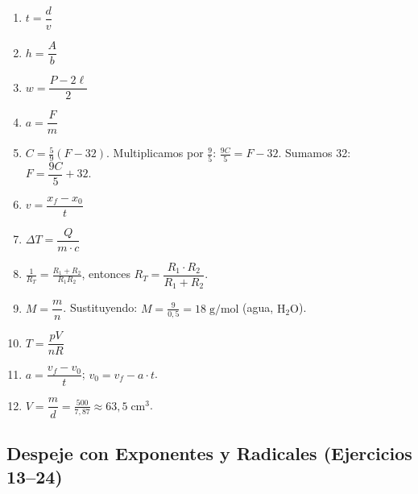 \documentclass[12pt, a4paper]{article}
\begin{document}
\begin{enumerate}[leftmargin=*, label=\textbf{\arabic*.}]
  \item $t = \dfrac{d}{v}$

  \item $h = \dfrac{A}{b}$

  \item $w = \dfrac{P - 2\ell}{2}$

  \item $a = \dfrac{F}{m}$

  \item $C = \frac{5}{9}(F-32)$. Multiplicamos por $\frac{9}{5}$: $\frac{9C}{5} = F - 32$. Sumamos 32: $F = \dfrac{9C}{5} + 32$.

  \item $v = \dfrac{x_f - x_0}{t}$

  \item $\Delta T = \dfrac{Q}{m \cdot c}$

  \item $\frac{1}{R_T} = \frac{R_1 + R_2}{R_1 R_2}$, entonces $R_T = \dfrac{R_1 \cdot R_2}{R_1 + R_2}$.

  \item $M = \dfrac{m}{n}$. Sustituyendo: $M = \frac{9}{0{,}5} = 18\;\text{g/mol}$ (agua, $\text{H}_2\text{O}$).

  \item $T = \dfrac{pV}{nR}$

  \item $a = \dfrac{v_f - v_0}{t}$; \quad $v_0 = v_f - a \cdot t$.

  \item $V = \dfrac{m}{d} = \frac{500}{7{,}87} \approx 63{,}5\;\text{cm}^3$.
\end{enumerate}

\subsection*{Despeje con Exponentes y Radicales (Ejercicios 13--24)}
\end{document}
